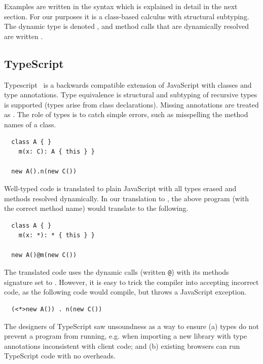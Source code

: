 \documentclass[a4paper,USenglish]{tex/lipics-v2016}
\begin{document}
Examples are written in the \kafka syntax which is explained in detail in
the next section. For our purposes it is a class-based calculus with
structural subtyping. The dynamic type is denoted \any, and method calls
that are dynamically resolved are written \DynCall\x\m\xp.


\newcommand{\code}[1]{{\tt #1}\xspace}

\subsection{TypeScript}

Typescript~\cite{BAT14} is a backwards compatible extension of JavaScript
with classes and type annotations. Type equivalence is structural and
subtyping of recursive types is supported (types arise from class
declarations). Missing annotations are treated as \any. The role of types is
to catch simple errors, such as misspelling the method names of a class.

\begin{lstlisting}
  class A { }
    m(x: C): A { this } }

  new A().n(new C())
\end{lstlisting}

Well-typed code is translated to plain JavaScript with all types erased and
methods resolved dynamically. In our translation to \kafka, the above program
(with the correct method name) would translate to the following.

\begin{lstlisting}
  class A { }
    m(x: *): * { this } }

  new A()@m(new C())
\end{lstlisting}

The translated code uses the dynamic calls (written \code @) with its methods signature
set to \any. However, it is easy to trick the compiler into accepting incorrect
code, as the following code would compile, but throws a JavaScript exception.

\begin{lstlisting}
  (<*>new A()) . n(new C())
\end{lstlisting}

The designers of TypeScript saw unsoundness as a way to ensure (a) types do
not prevent a program from running, e.g. when importing a new library with
type annotations inconsistent with client code; and (b) existing
browsers can run TypeScript code with no overheads.
\end{document}
